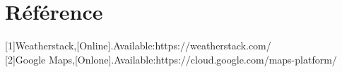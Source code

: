 \documentclass[14px]{article}
\begin{document}
\begin{figure1}
\end{figure1}
\section{Référence}
[1]Weatherstack,[Online].Available:https://weatherstack.com/\\

[2]Google Maps,[Onlone].Available:https://cloud.google.com/maps-platform/\\
\end{document}
